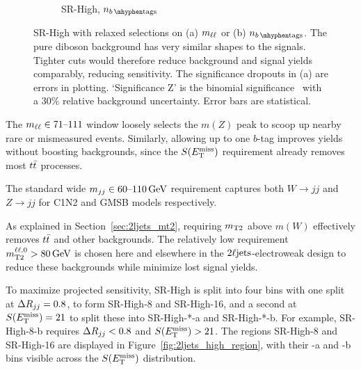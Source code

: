 \begin{figure}[tp]
\begin{subfigure}{0.48\textwidth}
\caption{SR-High, $\nbtag$}
\end{subfigure}
\caption[
SR-High with relaxed selections on (a) $\mll$ or (b) $\nbtag$
]{%
SR-High with relaxed selections on (a) $\mll$ or (b) $\nbtag$.
The pure diboson background has very similar shapes to the signals.
Tighter cuts would therefore reduce background and signal yields comparably,
reducing sensitivity.
The significance dropouts in (a) are errors in plotting.
`Significance Z' is the binomial significance~\cite{cousins2008evaluation}
with a $30\%$ relative background uncertainty.
Error bars are statistical.
}
\label{fig:2ljets_high_mll_b}
\end{figure}

The $\mll \in 71\textrm{--}111$ window loosely selects the $m(Z)$ peak to
scoop up nearby rare or mismeasured events.
Similarly, allowing up to one $b$-tag improves yields without boosting
backgrounds, since the $\metsig$ requirement already removes most $\ttbar$
processes.

The standard wide $\mjj \in 60\textrm{--}110\,\eV[G]$ requirement captures
both $W\rightarrow jj$ and $Z\rightarrow jj$ for C1N2 and GMSB models
respectively.

As explained in Section~\ref{sec:2ljets_mt2}, requiring $\mttwo$ above $m(W)$
effectively removes $\ttbar$ and other backgrounds.
The relatively low requirement $\mttwoll > 80\,\eV[G]$ is chosen here and
elsewhere in the $\twoljets$-electroweak design to reduce these backgrounds
while minimize lost signal yields.

To maximize projected sensitivity, SR-High is split into four bins with
one split at $\rjj = 0.8$, to form SR-High-8 and SR-High-16, and a second at
$\metsig = 21$ to split these into SR-High-*-a and SR-High-*-b.
For example, SR-High-8-b requires $\rjj < 0.8$ and $\metsig > 21$.
The regions SR-High-8 and SR-High-16 are displayed in
Figure~\ref{fig:2ljets_high_region}, with their -a and -b bins visible across
the $\metsig$ distribution.

